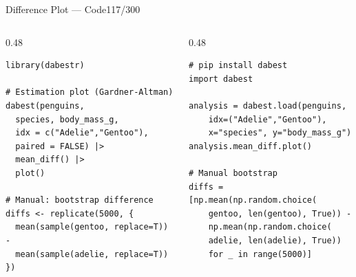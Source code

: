\documentclass[10pt]{beamer}
\newcommand{\smark}[1]{\hfill{\scriptsize\color{codegray}#1}}
\begin{document}
\begin{frame}[fragile]{Difference Plot --- Code}\smark{117/300}
\begin{columns}[T]
\begin{column}{0.48\textwidth}
\begin{lstlisting}[style=Rstyle]
library(dabestr)

# Estimation plot (Gardner-Altman)
dabest(penguins,
  species, body_mass_g,
  idx = c("Adelie","Gentoo"),
  paired = FALSE) |>
  mean_diff() |>
  plot()

# Manual: bootstrap difference
diffs <- replicate(5000, {
  mean(sample(gentoo, replace=T)) -
  mean(sample(adelie, replace=T))
})
\end{lstlisting}
\end{column}
\begin{column}{0.48\textwidth}
\begin{lstlisting}[style=Pystyle]
# pip install dabest
import dabest

analysis = dabest.load(penguins,
    idx=("Adelie","Gentoo"),
    x="species", y="body_mass_g")
analysis.mean_diff.plot()

# Manual bootstrap
diffs = [np.mean(np.random.choice(
    gentoo, len(gentoo), True)) -
    np.mean(np.random.choice(
    adelie, len(adelie), True))
    for _ in range(5000)]
\end{lstlisting}
\end{column}
\end{columns}
\end{frame}
\end{document}
